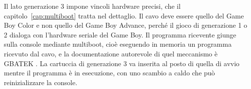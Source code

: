 Il lato generazione 3 impone vincoli hardware precisi, che il capitolo~\ref{cap:multiboot} tratta nel dettaglio. Il cavo deve essere quello del Game Boy Color e non quello del Game Boy Advance, perché il gioco di generazione 1 o 2 dialoga con l'hardware seriale del Game Boy. Il programma ricevente giunge sulla console mediante multiboot, cioè eseguendo in memoria un programma ricevuto dal cavo, e la documentazione autorevole di quel meccanismo è GBATEK \cite{gbatek}. La cartuccia di generazione 3 va inserita al posto di quella di avvio mentre il programma è in esecuzione, con uno scambio a caldo che può reinizializzare la console.
